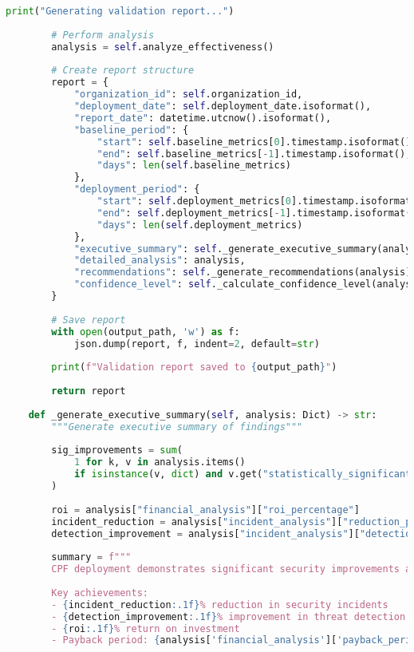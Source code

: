 \documentclass[11pt,a4paper]{article}
\begin{document}
\begin{lstlisting}[language=Python, caption=CPF Validation Framework]
        print("Generating validation report...")
        
        # Perform analysis
        analysis = self.analyze_effectiveness()
        
        # Create report structure
        report = {
            "organization_id": self.organization_id,
            "deployment_date": self.deployment_date.isoformat(),
            "report_date": datetime.utcnow().isoformat(),
            "baseline_period": {
                "start": self.baseline_metrics[0].timestamp.isoformat(),
                "end": self.baseline_metrics[-1].timestamp.isoformat(),
                "days": len(self.baseline_metrics)
            },
            "deployment_period": {
                "start": self.deployment_metrics[0].timestamp.isoformat(),
                "end": self.deployment_metrics[-1].timestamp.isoformat(),
                "days": len(self.deployment_metrics)
            },
            "executive_summary": self._generate_executive_summary(analysis),
            "detailed_analysis": analysis,
            "recommendations": self._generate_recommendations(analysis),
            "confidence_level": self._calculate_confidence_level(analysis)
        }
        
        # Save report
        with open(output_path, 'w') as f:
            json.dump(report, f, indent=2, default=str)
        
        print(f"Validation report saved to {output_path}")
        
        return report
    
    def _generate_executive_summary(self, analysis: Dict) -> str:
        """Generate executive summary of findings"""
        
        sig_improvements = sum(
            1 for k, v in analysis.items() 
            if isinstance(v, dict) and v.get("statistically_significant", False)
        )
        
        roi = analysis["financial_analysis"]["roi_percentage"]
        incident_reduction = analysis["incident_analysis"]["reduction_percentage"]
        detection_improvement = analysis["incident_analysis"]["detection_improvement"]
        
        summary = f"""
        CPF deployment demonstrates significant security improvements across {sig_improvements} key metrics.
        
        Key achievements:
        - {incident_reduction:.1f}% reduction in security incidents
        - {detection_improvement:.1f}% improvement in threat detection
        - {roi:.1f}% return on investment
        - Payback period: {analysis['financial_analysis']['payback_period_days']:.0f} days
        

\end{lstlisting}
\end{document}
